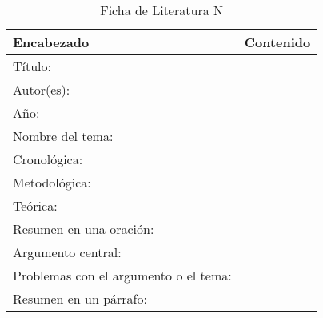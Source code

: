 \begin{table}[htbp]
    \caption{Ficha de Literatura N}
    \begin{center}
        \begin{tabular}{  m{3cm} | m{12cm}  }
        \hline\textbf{ Encabezado} & \textbf{Contenido }\\ \hline
        Título: &  \\ \hline
        Autor(es): &  \\ \hline
        Año: &  \\ \hline
        Nombre del tema: &  \\ \hline
        Cronológica: &   \\ \hline
        Metodológica: &  \\  \hline
        Teórica: &  \\ \hline
        Resumen en una oración: &  \\ \hline
        Argumento central: &   \\ \hline
        Problemas con el argumento o el tema: &  \\ \hline
        Resumen en un párrafo: & \\ \hline
        \end{tabular}
    \end{center}
\end{table}